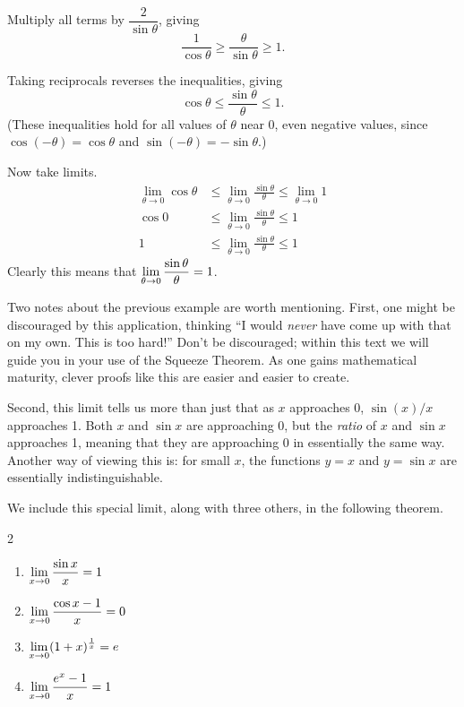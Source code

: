 \begin{example}
Multiply all terms by $\dfrac2{\sin\theta}$, giving
\[\frac1{\cos\theta}\geq\frac{\theta}{\sin\theta}\geq 1.\]

Taking reciprocals reverses the inequalities, giving
\[\cos\theta\leq\frac{\sin\theta}{\theta}\leq 1.\]
(These inequalities hold for all values of $\theta$ near 0, even negative values, since $\cos(-\theta)=\cos\theta$ and $\sin(-\theta)=-\sin\theta$.)

Now take limits.\vspace{-.3\baselineskip}
\begin{align*}
\lim_{\theta\to 0} \cos \theta &\leq \lim_{\theta\to 0} \frac{\sin\theta}{\theta} \leq \lim_{\theta\to 0}  1 \\
\cos 0 & \leq \lim_{\theta\to 0} \frac{\sin\theta}{\theta} \leq  1 \\
1 & \leq \lim_{\theta\to 0} \frac{\sin\theta}{\theta} \leq  1
\end{align*}
Clearly this means that $\displaystyle \lim_{\theta\to 0} \frac{\sin\theta}{\theta}=1$.
\end{example}

Two notes about the previous example are worth mentioning. First, one might be discouraged by this application, thinking ``I would \emph{never} have come up with that on my own. This is too hard!'' Don't be discouraged; within this text we will guide you in your use of the Squeeze Theorem. As one gains mathematical maturity, clever proofs like this are easier and easier to create.

Second, this limit tells us more than just that as $x$ approaches 0, $\sin(x)/x$ approaches 1. Both $x$ and $\sin x$ are approaching 0, but the \emph{ratio} of $x$ and $\sin x$ approaches 1, meaning that they are approaching 0 in essentially the same way. Another way of viewing this is: for small $x$, the functions $y=x$ and $y=\sin x$ are essentially indistinguishable.\bigskip

We include this special limit, along with three others, in the following theorem.

\begin{theorem}\label{thm:special_limits}%
\mbox{}\vspace{-1.5\baselineskip}
\begin{multicols}{2}
\begin{enumerate}
	\item		$\displaystyle \lim_{x\to 0} \frac{\sin x}{x} = 1$
	\item		$\displaystyle \lim_{x\to 0} \frac{\cos x-1}{x} = 0$
	\item		$\displaystyle \lim_{x\to 0} (1+x)^\frac1x = e$
	\item		$\displaystyle \lim_{x\to 0} \frac{e^x-1}{x} = 1$
\end{enumerate}
\end{multicols}
\end{theorem}

